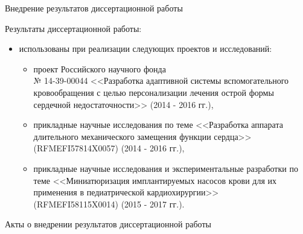 \documentclass[a4paper, 9pt]{beamer}
\begin{document}
\begin{frame}{Внедрение результатов диссертационной работы}

\begin{minipage}[ht]{0.46\textwidth}
\scriptsize
Результаты диссертационной работы:

\begin{itemize}
 \item использованы при реализации следующих проектов и исследований:
 \begin{itemize} \tiny
  \item проект Российского научного фонда \\ № 14-39-00044 <<Разработка адаптивной системы вспомогательного кровообращения с целью персонализации лечения острой формы сердечной недостаточности>> (2014 - 2016 гг.),
  \item прикладные научные исследования по теме <<Разработка аппарата длительного механического замещения функции сердца>> (RFMEFI57814X0057) (2014 - 2016 гг.),
  \item прикладные научные исследования и экспериментальные разработки по теме <<Миниатюризация имплантируемых насосов крови для их применения в педиатрической кардиохирургии>> \\ (RFMEFI58115X0014) (2015 - 2017 гг.).
 \end{itemize}
\end{itemize}
\end{minipage}
\hfill
\begin{minipage}[ht]{0.52\textwidth}
\scriptsize \vskip-8pt
Акты о внедрении результатов диссертационной работы
\begin{figure}

\end{figure}
\end{minipage}
\end{frame}
\end{document}
